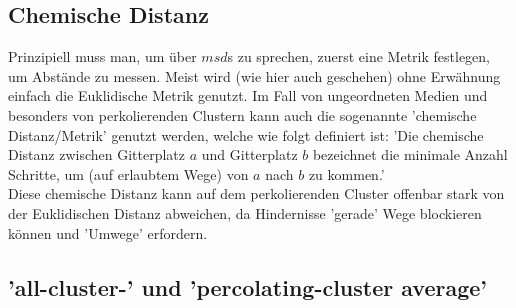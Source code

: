 \documentclass[a4paper, 12pt]{report}
\begin{document}
\subsection{Chemische Distanz}
Prinzipiell muss man, um über $msd$s zu sprechen, zuerst eine Metrik festlegen, um Abstände zu messen. Meist wird (wie hier auch geschehen) ohne Erwähnung einfach die Euklidische Metrik genutzt. Im Fall von ungeordneten Medien und besonders von perkolierenden Clustern kann auch die sogenannte 'chemische Distanz/Metrik' genutzt werden, welche wie folgt definiert ist:
'Die chemische Distanz zwischen Gitterplatz $a$ und Gitterplatz $b$ bezeichnet die minimale Anzahl Schritte, um (auf erlaubtem Wege) von $a$ nach $b$ zu kommen.' 
\\
\noindent Diese chemische Distanz kann auf dem perkolierenden Cluster offenbar stark von der Euklidischen Distanz abweichen, da Hindernisse 'gerade' Wege blockieren können und 'Umwege' erfordern.
 

\subsection{'all-cluster-' und 'percolating-cluster average'}
\end{document}
